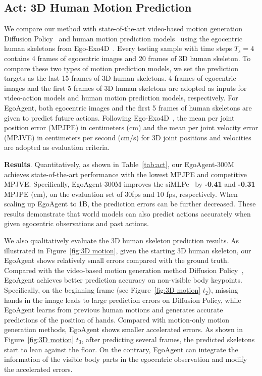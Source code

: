 \subsection{Act: 3D Human Motion Prediction}
We compare our method with state-of-the-art video-based motion generation Diffusion Policy~\cite{chi2023diffusion} and human motion prediction models~\cite{guo2023back} using the egocentric human skeletons from Ego-Exo4D~\cite{grauman2024ego}. 
Every testing sample with time steps $T_{s}=4$ contains 4 frames of egocentric images and 20 frames of 3D human skeleton. 
To compare these two types of motion prediction models, we set the prediction targets as the last 15 frames of 3D human skeletons. 4 frames of egocentric images and the first 5 frames of 3D human skeletons are adopted as inputs for video-action models and human motion prediction models, respectively.
For EgoAgent, both egocentric images and the first 5 frames of human skeletons are given to predict future actions. Following Ego-Exo4D~\cite{grauman2024ego}, the mean per joint position error (MPJPE) in centimeters (cm) and the mean per joint velocity error (MPJVE) in centimeters per second (cm/s) for 3D joint positions and velocities are adopted as evaluation criteria.


\vspace{1.5mm}
\noindent\textbf{Results}. Quantitatively, as shown in Table~\ref{tab:act}, our EgoAgent-300M achieves state-of-the-art performance with the lowest MPJPE and competitive MPJVE. Specifically, EgoAgent-300M improves the siMLPe~\cite{guo2023back} by \textbf{-0.41} and \textbf{-0.31} MPJPE (cm), on the evaluation set of 30fps and 10 fps, respectively. When scaling up EgoAgent to 1B, the prediction errors can be further decreased. These results demonstrate that world models can also predict actions accurately when given egocentric observations and past actions.

We also qualitatively evaluate the 3D human skeleton prediction results. As illustrated in Figure~\ref{fig:3D motion}, given the starting 3D human skeleton, our EgoAgent shows relatively small errors compared with the ground truth. Compared with the video-based motion generation method Diffusion Policy~\cite{chi2023diffusion}, EgoAgent achieves better prediction accuracy on non-visible body keypoints. Specifically, on the beginning frame (see Figure~\ref{fig:3D motion} $t_2$), missing hands in the image leads to large prediction errors on Diffusion Policy, while EgoAgent learns from previous human motions and generates accurate predictions of the position of hands. Compared with motion-only motion generation methods, EgoAgent shows smaller accelerated errors. As shown in Figure~\ref{fig:3D motion} $t_3$, after predicting several frames, the predicted skeletons start to lean against the floor. On the contrary, EgoAgent can integrate the information of the visible body parts in the egocentric observation and modify the accelerated errors.

